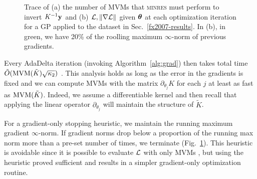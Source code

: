 \documentclass[twoside]{article}
\begin{document}
\begin{figure}[!ht]
\begin{center}
\end{center}
\caption{Trace of (a) the number of MVMs that \textsc{minres} must perform to invert $K^{-1}\textbf{y}$ and (b) $\mathcal{L}, \left\| \nabla\mathcal{L} \right\|$ given ${\boldsymbol\theta}$ at each optimization iteration for a GP applied to the dataset in Sec.~\ref{fx2007-results}. In (b), in green, we have 20\% of the roolling maximum $\infty$-norm of previous gradients.
}
\label{fx2007-iterations}
\end{figure}

Every AdaDelta iteration (invoking Algorithm~\ref{alg:grad}) then takes total time $\tilde{O}(\operatorname{MVM}(\tilde{K})\sqrt{\kappa_2})$ \citep{raykar2007fast}. This analysis holds as long as the error in the gradients is fixed and we can compute MVMs with the matrix $\partial_{\theta_j}K$ for each $j$ at least as fast as $\operatorname{MVM}({\tilde{K}})$. Indeed, we assume a differentiable kernel and then recall that applying the linear operator $\partial_{\theta_j}$ will maintain the structure of $\tilde{K}$.

For a gradient-only stopping heuristic, we maintain the running maximum gradient $\infty$-norm. If gradient norms drop below a proportion of the running max norm more than a pre-set number of times, we terminate (Fig.~\ref{fx2007-iterations}). This heuristic is avoidable since it is possible to evaluate $\mathcal{L}$ with only MVMs \citep{han2015large}, but using the heuristic proved sufficient and results in a simpler gradient-only optimization routine.
\end{document}
